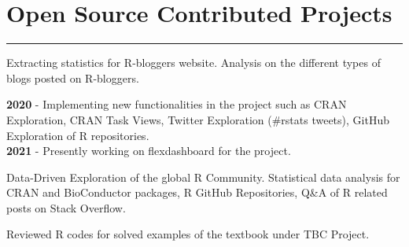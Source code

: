 \documentclass[]{meetresume-class}
\begin{document}
\begin{minipage}[t]{0.66\textwidth}
		\section{Open Source Contributed Projects} 
		\noindent\rule{12.5cm}{0.4pt}
		 
		\descript{}
		\noindent
		\hspace{6em}%
		\begin{minipage}{0.80\textwidth\vspace{2pt}}
			Extracting statistics for R-bloggers website. Analysis on the different types of blogs posted on R-bloggers.
		\end{minipage}
		\sectionsep
		
		 
		\descript{}
		\noindent
		\hspace{6em}%
		\begin{minipage}{0.80\textwidth\vspace{2pt}}
			\textbf{2020} - Implementing new functionalities in the project such as CRAN Exploration, CRAN Task Views, Twitter Exploration (\#rstats tweets), GitHub Exploration of R repositories.\\
			\textbf{2021} - Presently working on flexdashboard for the project.
		\end{minipage}
		\sectionsep
		
		 
		\descript{}
		\noindent
		\hspace{5em}%
		\begin{minipage}{0.85\textwidth\vspace{2pt}}
			Data-Driven Exploration of the global R Community. Statistical data analysis for
			CRAN and BioConductor packages, R GitHub Repositories, Q\&A of R related
			posts on Stack Overflow.
		\end{minipage}
		\sectionsep
		
		 
		\noindent
		\hspace{5em}%
		\begin{minipage}{0.85\textwidth\vspace{2pt}}
			Reviewed R codes for solved examples of the textbook under TBC Project. 
		\end{minipage}
		\sectionsep

\end{minipage}
\end{document}
